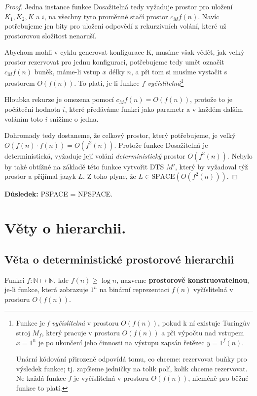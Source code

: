 \documentclass[11pt]{report} %
\newcommand{\N}{\mathbb{N}}
\begin{document}
\begin{proof}
Jedna instance funkce Dosažitelná tedy vyžaduje prostor pro uložení $K_1, K_2, K$ a $i$, na všechny tyto proměnné stačí prostor $c_Mf(n)$. Navíc potřebujeme jen bity pro uložení odpovědí z rekurzivních volání, které už prostorovou složitost nenaruší. 

Abychom mohli v cyklu generovat konfigurace K, musíme však vědět, jak velký prostor rezervovat pro jednu konfiguraci,
potřebujeme tedy umět označit $c_Mf(n)$ buněk, máme-li vstup $x$ délky $n$, a při tom si musíme vystačit s prostorem $O(f(n))$. To platí, je-li funkce $f$ \textit{vyčíslitelná}\footnote{Funkce je \textit{f vyčíslitelná} v prostoru $O(f(n))$, pokud k ní existuje Turingův stroj $M_f$, který pracuje v prostoru $O(f(n))$ a při výpočtu nad vstupem $x = 1^n$ je po ukončení jeho činnosti na výstupu zapsán řetězec $y = 1^f(n)$. 

Unární kódování přirozeně odpovídá tomu, co chceme: rezervovat buňky pro výsledek funkce; tj. zapíšeme jedničky na tolik polí, kolik chceme rezervovat. Ne každá funkce $f$ je vyčíslitelná v prostoru $O(f(n))$, nicméně pro běžné funkce to platí.}

Hloubka rekurze je omezena pomocí $c_Mf(n) = O(f(n))$, protože to je počáteční hodnota $i$, které předáváme funkci jako parametr a v každém dalším voláním toto $i$ snížíme o jedna. 

Dohromady tedy dostaneme, že celkový prostor, který potřebujeme, je velký $O(f(n) \cdot f(n)) = O(f^2(n))$. Protože funkce Dosažitelná je deterministická, vyžaduje její volání \textit{deterministický} prostor $O(f^2(n))$. Nebylo by také obtížné na základě této funkce vytvořit DTS $M'$, který by vyžadoval týž prostor a přijímal jazyk $L$. Z toho plyne, že
$L \in \text{SPACE}(O(f^2(n)))$.
\end{proof}

\noindent\textbf{Důsledek:} PSPACE = NPSPACE.

\section{Věty o hierarchii.}
\subsection{Věta o deterministické prostorové hierarchii}
Funkci $f : \N \mapsto \N$, kde $f(n) \geq \log n$, nazveme \textbf{prostorově konstruovatelnou}, je-li funkce, která zobrazuje $1^n$ na binární reprezentaci $f(n)$ vyčíslitelná v prostoru $O(f(n))$.
\end{document}
